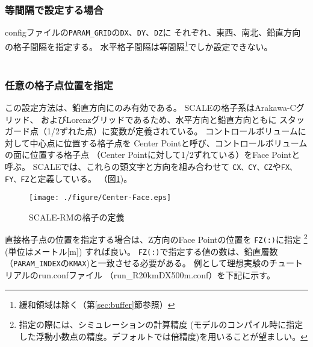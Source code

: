 \subsubsection{等間隔で設定する場合}
configファイルの\verb|PARAM_GRID|の\verb|DX|、\verb|DY|、\verb|DZ|に
それぞれ、東西、南北、鉛直方向の格子間隔を指定する。
水平格子間隔は等間隔\footnote{緩和領域は除く（第\ref{sec:buffer}節参照）}でしか設定できない。\\

\\


\subsubsection{任意の格子点位置を指定}
この設定方法は、鉛直方向にのみ有効である。
SCALEの格子系はArakawa-Cグリッド、
およびLorenzグリッドであるため、水平方向と鉛直方向ともに
スタッガード点（1/2ずれた点）に変数が定義されている。
コントロールボリュームに対して中心点に位置する格子点を
Center Pointと呼び、コントロールボリュームの面に位置する格子点
（Center Pointに対して1/2ずれている）をFace Pointと呼ぶ。
SCALEでは、これらの頭文字と方向を組み合わせて
\verb|CX、CY、CZ|や\verb|FX、FY、FZ|と定義している。
（図\ref{fig:scale_grid})。


\begin{figure}[h]
\begin{center}
  \texttt{[image: ./figure/Center-Face.eps]}\\
  \caption{SCALE-RMの格子の定義}
  \label{fig:scale_grid}
\end{center}
\end{figure}

直接格子点の位置を指定する場合は、Z方向のFace Pointの位置を
\verb|FZ(:)|に指定
\footnote{指定の際には、シミュレーションの計算精度
(モデルのコンパイル時に指定した浮動小数点の精度。デフォルトでは倍精度)を用いることが望ましい。}
(単位はメートル[m]) すれば良い。
\verb|FZ(:)|で指定する値の数は、鉛直層数（\verb|PARAM_INDEX|の\verb|KMAX|)と一致させる必要がある。
例として理想実験のチュートリアルのrun.confファイル
（run\_R20kmDX500m.conf）を下記に示す。\\

